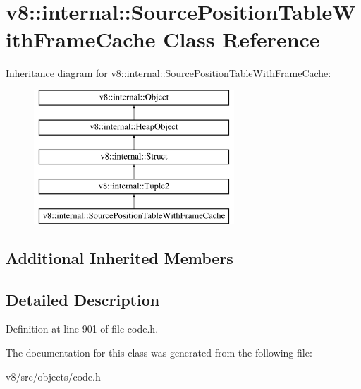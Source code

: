 \hypertarget{classv8_1_1internal_1_1SourcePositionTableWithFrameCache}{}\section{v8\+:\+:internal\+:\+:Source\+Position\+Table\+With\+Frame\+Cache Class Reference}
\label{classv8_1_1internal_1_1SourcePositionTableWithFrameCache}
Inheritance diagram for v8\+:\+:internal\+:\+:Source\+Position\+Table\+With\+Frame\+Cache\+:\begin{figure}[H]
\begin{center}
\leavevmode
\includegraphics[height=5.000000cm]{classv8_1_1internal_1_1SourcePositionTableWithFrameCache}
\end{center}
\end{figure}
\subsection*{Additional Inherited Members}


\subsection{Detailed Description}


Definition at line 901 of file code.\+h.



The documentation for this class was generated from the following file\+:\begin{DoxyCompactItemize}
\item 
v8/src/objects/code.\+h\end{DoxyCompactItemize}
